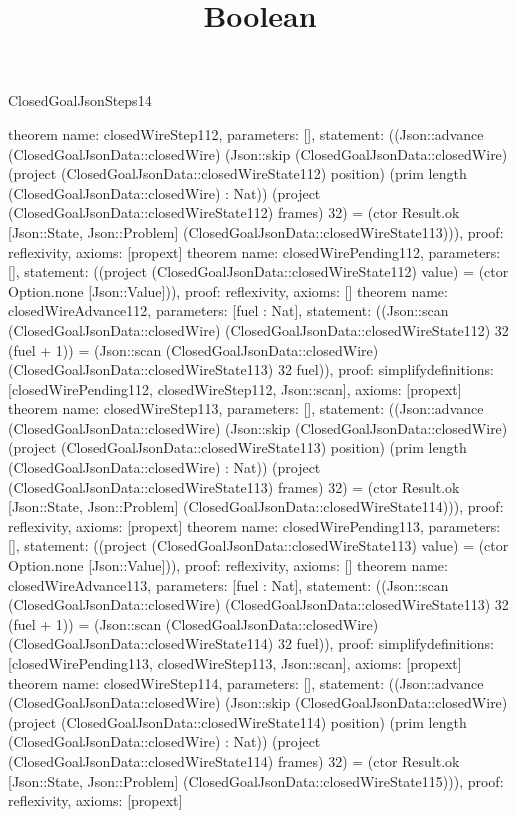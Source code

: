 \begin{lexlean}{ClosedGoalJsonSteps14}
\title{Boolean}
\begin{semanticmodule}
theorem{
 name: closedWireStep112, parameters: [],
 statement: ((Json::advance (ClosedGoalJsonData::closedWire) (Json::skip (ClosedGoalJsonData::closedWire) (project (ClosedGoalJsonData::closedWireState112) position) (prim length (ClosedGoalJsonData::closedWire) : Nat)) (project (ClosedGoalJsonData::closedWireState112) frames) 32) = (ctor Result.ok [Json::State, Json::Problem] (ClosedGoalJsonData::closedWireState113))), proof: reflexivity{}, axioms: [propext]
}
theorem{
 name: closedWirePending112, parameters: [],
 statement: ((project (ClosedGoalJsonData::closedWireState112) value) = (ctor Option.none [Json::Value])), proof: reflexivity{}, axioms: []
}
theorem{
 name: closedWireAdvance112, parameters: [fuel : Nat],
 statement: ((Json::scan (ClosedGoalJsonData::closedWire) (ClosedGoalJsonData::closedWireState112) 32 (fuel + 1)) = (Json::scan (ClosedGoalJsonData::closedWire) (ClosedGoalJsonData::closedWireState113) 32 fuel)), proof: simplify{definitions: [closedWirePending112, closedWireStep112, Json::scan]}, axioms: [propext]
}
theorem{
 name: closedWireStep113, parameters: [],
 statement: ((Json::advance (ClosedGoalJsonData::closedWire) (Json::skip (ClosedGoalJsonData::closedWire) (project (ClosedGoalJsonData::closedWireState113) position) (prim length (ClosedGoalJsonData::closedWire) : Nat)) (project (ClosedGoalJsonData::closedWireState113) frames) 32) = (ctor Result.ok [Json::State, Json::Problem] (ClosedGoalJsonData::closedWireState114))), proof: reflexivity{}, axioms: [propext]
}
theorem{
 name: closedWirePending113, parameters: [],
 statement: ((project (ClosedGoalJsonData::closedWireState113) value) = (ctor Option.none [Json::Value])), proof: reflexivity{}, axioms: []
}
theorem{
 name: closedWireAdvance113, parameters: [fuel : Nat],
 statement: ((Json::scan (ClosedGoalJsonData::closedWire) (ClosedGoalJsonData::closedWireState113) 32 (fuel + 1)) = (Json::scan (ClosedGoalJsonData::closedWire) (ClosedGoalJsonData::closedWireState114) 32 fuel)), proof: simplify{definitions: [closedWirePending113, closedWireStep113, Json::scan]}, axioms: [propext]
}
theorem{
 name: closedWireStep114, parameters: [],
 statement: ((Json::advance (ClosedGoalJsonData::closedWire) (Json::skip (ClosedGoalJsonData::closedWire) (project (ClosedGoalJsonData::closedWireState114) position) (prim length (ClosedGoalJsonData::closedWire) : Nat)) (project (ClosedGoalJsonData::closedWireState114) frames) 32) = (ctor Result.ok [Json::State, Json::Problem] (ClosedGoalJsonData::closedWireState115))), proof: reflexivity{}, axioms: [propext]
}
\end{semanticmodule}
\end{lexlean}
